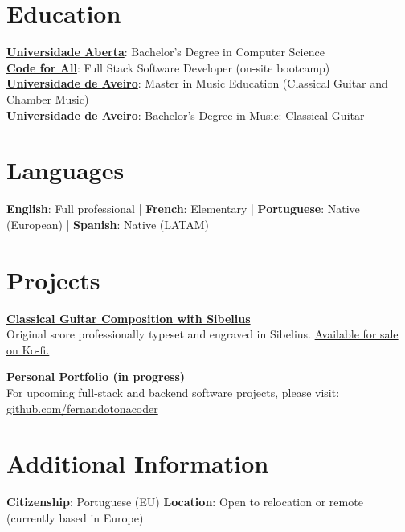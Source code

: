 \documentclass[a4paper,10pt]{article}
\begin{document}
\section{Education}
\vspace{3pt}
\textbf{\href{https://guiadoscursos.uab.pt/en/cursos/licenciatura-em-engenharia-informatica/}{Universidade Aberta}}: Bachelor’s Degree in Computer Science\\[4pt]
\textbf{\href{https://codeforall.com/}{Code for All}}: Full Stack Software Developer (on-site bootcamp)\\[4pt]
\textbf{\href{https://www.ua.pt/en/curso/184/}{Universidade de Aveiro}}: Master in Music Education (Classical Guitar and Chamber Music)\\[4pt]
\textbf{\href{https://www.ua.pt/en/curso/40/}{Universidade de Aveiro}}: Bachelor’s Degree in Music: Classical Guitar

\section{Languages}
{\small
\textbf{English}: Full professional \quad | \quad
\textbf{French}: Elementary \quad | \quad
\textbf{Portuguese}: Native (European) \quad | \quad
\textbf{Spanish}: Native (LATAM)
}
\section{Projects}
{\small
\textbf{\href{https://ko-fi.com/s/b781636926}{Classical Guitar Composition with Sibelius}}\\
Original score professionally typeset and engraved in Sibelius. \href{https://ko-fi.com/s/b781636926}{Available for sale on Ko-fi.}

\textbf{Personal Portfolio (in progress)}\\
For upcoming full-stack and backend software projects, please visit: \href{https://github.com/fernandotonacoder}{github.com/fernandotonacoder}
}

\section{Additional Information}
{\small
\textbf{Citizenship}: Portuguese (EU) \quad
\textbf{Location}: Open to relocation or remote (currently based in Europe) \quad
}
\end{document}
